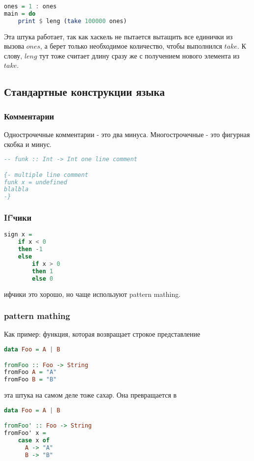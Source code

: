 \documentclass[10pt, a4paper]{article}
\begin{document}
\begin{lstlisting}[language=haskell]
ones = 1 : ones
main = do
    print $ leng (take 100000 ones)
\end{lstlisting}

Эта штука работает, так как хаскель не пытается вытащить все единички из вызова $ones$, а берет только необходимое количество, чтобы выполнился $take$. К слову, $leng$ тут тоже считает длину сразу же с получением нового элемента из $take$.

\subsection{Стандартные конструкции языка}

\subsubsection{Комментарии}
Однострочечные комментарии - это два минуса. Многострочечные - это фигурная скобка и минус.
\begin{lstlisting}[language=haskell]
-- funk :: Int -> Int one line comment

{- multiple line comment
funk x = undefined
blalbla
-}
\end{lstlisting}


\subsubsection{If'чики}
\begin{lstlisting}[language=haskell]
sign x = 
    if x < 0 
    then -1 
    else 
        if x > 0
        then 1 
        else 0
\end{lstlisting}

ифчики это хорошо, но чаще используют pattern mathing. 

\subsubsection{pattern mathing}
Как пример: функция, которая возвращает строкое представление

\begin{lstlisting}[language=haskell]
data Foo = A | B

fromFoo :: Foo -> String 
fromFoo A = "A"
fromFoo B = "B"
\end{lstlisting}

эта штука на самом деле тоже сахар. Она превращается в 

\begin{lstlisting}[language=haskell]
data Foo = A | B

fromFoo' :: Foo -> String 
fromFoo' x = 
    case x of
      A -> "A"
      B -> "B"
\end{lstlisting}
\end{document}
